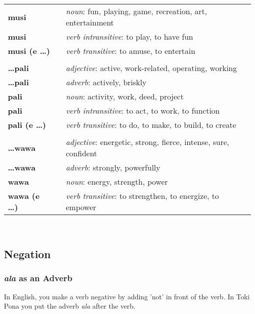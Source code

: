 \begin{supertabular}{p{2,5cm}|ll}
\textbf{musi} && \textit{noun}: fun, playing, game, recreation, art, entertainment \\ %
\textbf{musi} && \textit{verb intransitive}: to play, to have fun \\ %
\textbf{musi (e \dots)} && \textit{verb transitive}: to amuse, to entertain \\ %
 && \\ %
%
\textbf{\dots pali} && \textit{adjective}: active, work-related, operating, working \\ %
\textbf{\dots pali} && \textit{adverb}: actively, briskly \\ %
\textbf{pali} && \textit{noun}: activity, work, deed, project \\ %
\textbf{pali} && \textit{verb intransitive}: to act, to work, to function \\ %
\textbf{pali (e \dots)} && \textit{verb transitive}: to do, to make, to build, to create \\ %
 && \\ %
%
\textbf{\dots wawa} && \textit{adjective}: energetic, strong, fierce, intense, sure, confident \\ %
\textbf{\dots wawa} && \textit{adverb}: strongly, powerfully \\ %
\textbf{wawa} && \textit{noun}: energy, strength, power \\ %
\textbf{wawa (e \dots)} && \textit{verb transitive}: to strengthen, to energize, to empower \\ %
\end{supertabular} \\
%
\newpage
%
\subsection*{Negation}
%
%
\subsubsection*{\textit{ala} as an Adverb}
%
%
In English, you make a verb negative by adding 'not' in front of the verb.
In Toki Pona you put the adverb \textit{ala} after the verb. 

